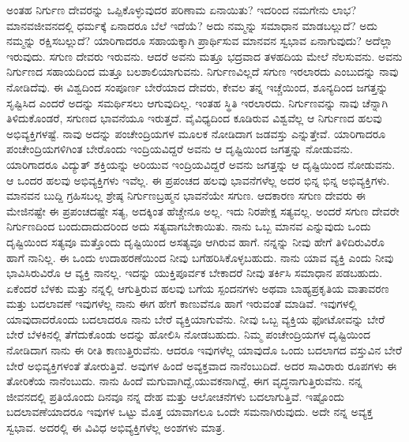 ಅಂತಹ ನಿರ್ಗುಣ ದೇವರನ್ನು ಒಪ್ಪಿಕೊಳ್ಳುವುದರ ಪರಿಣಾಮ ಏನಾಯಿತು? ಇದರಿಂದ ನಮಗೇನು ಲಾಭ? ಮಾನವಜೀವನದಲ್ಲಿ ಧರ್ಮಕ್ಕೆ ಏನಾದರೂ ಬೆಲೆ ಇದೆಯೆ? ಅದು ನಮ್ಮನ್ನು ಸಮಾಧಾನ ಮಾಡಬಲ್ಲುದೆ? ಅದು ನಮ್ಮನ್ನು ರಕ್ಷಿಸಬಲ್ಲುದೆ? ಯಾರಿಗಾದರೂ ಸಹಾಯಕ್ಕಾಗಿ ಪ್ರಾರ್ಥಿಸುವ ಮಾನವನ ಸ್ವಭಾವ ಏನಾಗುವುದು? ಅದೆಲ್ಲಾ ಇರುವುದು. ಸಗುಣ ದೇವರು ಇರುವನು. ಆದರೆ ಅವನು ಮತ್ತೂ ಭದ್ರವಾದ ತಳಹದಿಯ ಮೇಲೆ ನೆಲಸುವನು. ಅವನು ನಿರ್ಗುಣದ ಸಹಾಯದಿಂದ ಮತ್ತೂ ಬಲಶಾಲಿಯಾಗುವನು. ನಿರ್ಗುಣವಿಲ್ಲದೆ ಸಗುಣ ಇರಲಾರದು ಎಂಬುದನ್ನು ನಾವು ನೋಡಿದೆವು. ಈ ವಿಶ್ವದಿಂದ ಸಂಪೂರ್ಣ ಬೇರೆಯಾದ ದೇವರು, ಕೇವಲ ತನ್ನ ಇಚ್ಚೆಯಿಂದ, ಶೂನ್ಯದಿಂದ ಜಗತ್ತನ್ನು ಸೃಷ್ಟಿಸಿದ ಎಂದರೆ ಅದನ್ನು ಸಮರ್ಥಿಸಲು ಆಗುವುದಿಲ್ಲ. ಇಂತಹ ಸ್ಥಿತಿ ಇರಲಾರದು. ನಿರ್ಗುಣವನ್ನು ನಾವು ಚೆನ್ನಾಗಿ ತಿಳಿದುಕೊಂಡರೆ, ಸಗುಣದ ಭಾವನೆಯೂ ಇರುತ್ತದೆ. ವೈವಿಧ್ಯದಿಂದ ಕೂಡಿರುವ ವಿಶ್ವವೆಲ್ಲ ಆ ನಿರ್ಗುಣದ ಹಲವು ಅಭಿವ್ಯಕ್ತಿಗಳಷ್ಟೆ. ನಾವು ಅದನ್ನು ಪಂಚೇಂದ್ರಿಯಗಳ ಮೂಲಕ ನೋಡಿದಾಗ ಜಡವಸ್ತು ಎನ್ನುತ್ತೇವೆ. ಯಾರಿಗಾದರೂ ಪಂಚೇಂದ್ರಿಯಗಳಿಗಿಂತ ಬೇರೊಂದು ಇಂದ್ರಿಯವಿದ್ದರೆ ಅವನು ಆ ದೃಷ್ಟಿಯಿಂದ ಜಗತ್ತನ್ನು ನೋಡುವನು. ಯಾರಿಗಾದರೂ ವಿದ್ಯುತ್ ಶಕ್ತಿಯನ್ನು ಅರಿಯುವ ಇಂದ್ರಿಯವಿದ್ದರೆ ಅವನು ಜಗತ್ತನ್ನು ಆ ದೃಷ್ಟಿಯಿಂದ ನೋಡುವನು. ಆ ಒಂದರ ಹಲವು ಅಭಿವ್ಯಕ್ತಿಗಳು ಇವೆಲ್ಲ. ಈ ಪ್ರಪಂಚದ ಹಲವು ಭಾವನೆಗಳೆಲ್ಲ ಅದರ ಭಿನ್ನ ಭಿನ್ನ ಅಭಿವ್ಯಕ್ತಿಗಳು. ಮಾನವನ ಬುದ್ದಿ ಗ್ರಹಿಸಬಲ್ಲ ಶ್ರೇಷ್ಠ ನಿರ್ಗುಣಬ್ರಹ್ಮನ ಭಾವನೆಯೇ ಸಗುಣ. ಆದಕಾರಣ ಸಗುಣ ದೇವರು ಈ ಮೇಜಿನಷ್ಟೇ ಈ ಪ್ರಪಂಚದಷ್ಟೇ ಸತ್ಯ, ಅದಕ್ಕಿಂತ ಹೆಚ್ಚೇನೂ ಅಲ್ಲ. ಇದು ನಿರಪೇಕ್ಷ ಸತ್ಯವಲ್ಲ. ಅಂದರೆ ಸಗುಣ ದೇವರೇ ನಿರ್ಗುಣದಿಂದ ಬಂದುದಾದುದರಿಂದ ಅದು ಸತ್ಯವಾಗಬೇಕಾಯಿತು. ನಾನು ಒಬ್ಬ ಮಾನವ ಎನ್ನುವುದು ಒಂದು ದೃಷ್ಟಿಯಿಂದ ಸತ್ಯವೂ ಮತ್ತೊಂದು ದೃಷ್ಟಿಯಿಂದ ಅಸತ್ಯವೂ ಆಗಿರುವ ಹಾಗೆ. ನನ್ನನ್ನು ನೀವು ಹೇಗೆ ತಿಳಿದಿರುವಿರೊ ಹಾಗೆ ನಾನಿಲ್ಲ. ಈ ಒಂದು ಉದಾಹರಣೆಯಿಂದ ನೀವು ಬಗೆಹರಿಸಿಕೊಳ್ಳಬಹುದು. ನಾನು ಯಾವ ವ್ಯಕ್ತಿ ಎಂದು ನೀವು ಭಾವಿಸಿರುವಿರೊ ಆ ವ್ಯಕ್ತಿ ನಾನಲ್ಲ. ಇದನ್ನು ಯುಕ್ತಿಪೂರ್ವಕ ಬೇಕಾದರೆ ನೀವು ತರ್ಕಿಸಿ ಸಮಾಧಾನ ಪಡಬಹುದು. ಏಕೆಂದರೆ ಬೆಳಕು ಮತ್ತು ನನ್ನಲ್ಲಿ ಆಗುತ್ತಿರುವ ಹಲವು ಬಗೆಯ ಸ್ಪಂದನಗಳು ಅಥವಾ ಬಾಹ್ಯಪ್ರಕೃತಿಯ ವಾತಾವರಣ ಮತ್ತು ಬದಲಾವಣೆ ಇವುಗಳೆಲ್ಲ ನಾನು ಈಗ ಹೇಗೆ ಕಾಣುವೆನೂ ಹಾಗೆ ಇರುವಂತೆ ಮಾಡಿವೆ. ಇವುಗಳಲ್ಲಿ ಯಾವುದಾದರೊಂದು ಬದಲಾದರೂ ನಾನು ಬೇರೆ ವ್ಯಕ್ತಿಯಾಗುವೆನು. ನೀವು ಒಬ್ಬ ವ್ಯಕ್ತಿಯ ಫೋಟೋವನ್ನು ಬೇರೆ ಬೇರೆ ಬೆಳಕಿನಲ್ಲಿ ತೆಗೆದುಕೊಂಡು ಅದನ್ನು ಹೋಲಿಸಿ ನೋಡಬಹುದು. ನಿಮ್ಮ ಪಂಚೇಂದ್ರಿಯಗಳ ದೃಷ್ಟಿಯಿಂದ ನೋಡಿದಾಗ ನಾನು ಈ ರೀತಿ ಕಾಣುತ್ತಿರುವೆನು. ಆದರೂ ಇವುಗಳೆಲ್ಲ ಯಾವುದೊ ಒಂದು ಬದಲಾಗದ ವಸ್ತುವಿನ ಬೇರೆ ಬೇರೆ ಅಭಿವ್ಯಕ್ತಿಗಳಂತೆ ತೋರುತ್ತಿವೆ. ಅವುಗಳ ಹಿಂದೆ ಅವ್ಯಕ್ತವಾದ ನಾನೆಂಬುದಿದೆ. ಅದರ ಸಾವಿರಾರು ರೂಪಗಳು ಈ ತೋರಿಕೆಯ ನಾನೆಂಬುದು. ನಾನು ಹಿಂದೆ ಮಗುವಾಗಿದ್ದೆ,\break ಯುವಕನಾಗಿದ್ದೆ, ಈಗ ವೃದ್ಧನಾಗುತ್ತಿರುವೆನು. ನನ್ನ ಜೀವನದಲ್ಲಿ ಪ್ರತಿಯೊಂದು ದಿನವೂ ನನ್ನ ದೇಹ ಮತ್ತು ಆಲೋಚನೆಗಳು ಬದಲಾಗುತ್ತಿವೆ. ಇಷ್ಟೊಂದು ಬದಲಾವಣೆಯಾದರೂ ಇವುಗಳ ಒಟ್ಟು ಮೊತ್ತ ಯಾವಾಗಲೂ ಒಂದೇ ಸಮನಾಗಿರುವುದು. ಅದೇ ನನ್ನ ಅವ್ಯಕ್ತ ಸ್ವಭಾವ. ಅದರಲ್ಲಿ ಈ ವಿವಿಧ ಅಭಿವ್ಯಕ್ತಿಗಳೆಲ್ಲ ಅಂಶಗಳು ಮಾತ್ರ.

